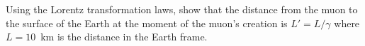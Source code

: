 \documentclass[12pt, oneside]{report}    %
\let\oldsection\section
\def\section{%
  \setcounter{sidenote}{1}%
  \oldsection
}
\begin{document}
\begin{exercise}
Using the Lorentz transformation laws, show that the distance from the muon to the surface of the Earth at the moment of the muon's creation is $L'=L/\gamma$ where $L=10$~km is the distance in the Earth frame. 
\end{exercise}


\end{document}
